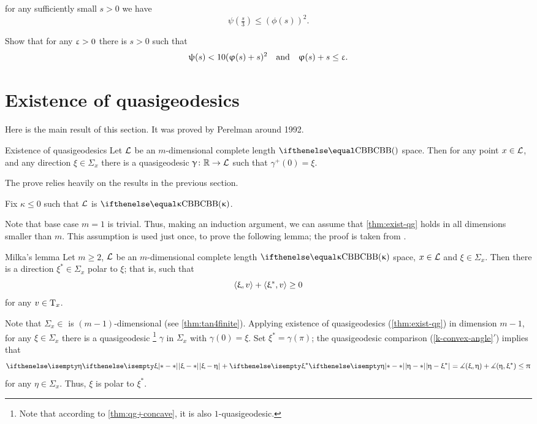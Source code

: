 \begin{subthm}{}for any sufficiently small $s>0$ we have
\[\psi(\tfrac{s}{3})\le (\phi(s))^2.\]
\end{subthm}
Show that for any $\upvarepsilon>0$ there is  $s>0$ such that
\[\psi(s)< 10 (\phi(s)+s)^2\ \ \ \text{and}\ \ \ \phi(s)+s\le\eps.\]

\endclaim\rm






\section{Existence of quasigeodesics}\label{step3-1}

Here is the main result of this section.
It was proved by Perelman around 1992.


\begin{thm}{Existence of quasigeodesics}\label{thm:exist-qg}
Let $\mathcal{L}$ be an $m$-dimensional complete length $\Alex{}$ space. 
Then for any point $x\in \spc{L}$, and any direction $\xi\in \Sigma_x$
there is a quasigeodesic $\gamma\:\RR\to \spc{L}$ such that 
$\gamma^+(0)=\xi$.
\end{thm}

The prove relies heavily on the results in the previous section.

Fix $\kappa\le0$ such that $\mathcal{L}$ is $\Alex\kappa$.

Note that base case $m=1$ is trivial.
Thus, making an induction argument, we can assume that \ref{thm:exist-qg} holds in all dimensions smaller than $m$.
This assumption is used just once, to prove the following lemma;
the proof is taken from \cite{milka:poly1}.

\begin{thm}{Milka's lemma}\label{lem-milka}
\label{lem:milka}
Let $m\ge 2$, 
$\mathcal{L}$ be an $m$-dimensional complete length $\Alex\kappa$ space, 
$x\in \spc{L}$ 
and $\xi\in \Sigma_x$.
Then there is a direction $\xi^*\in\Sigma_x$ polar to $\xi$; 
that is, such that
\[\<\xi,v\>+\<\xi^*,v\>\ge 0\]
for any $v\in \T_x$.
\end{thm}


 Note that $\Sigma_x\in$ is $(m-1)$-dimensional (see \ref{thm:tan4finite}). 
Applying  existence  of quasigeodesics (\ref{thm:exist-qg}) in dimension $m-1$,
for any 
$\xi\in \Sigma_x$ there is a quasigeodesic%
\footnote{Note that according to \ref{thm:qg+concave}, it is also $1$-quasigeodesic.}
 $\gamma$ in $\Sigma_x$ with $\gamma(0)=\xi$.
Set $\xi^*=\gamma(\pi)$;
the quasigeodesic comparison (\ref{k-convex-angle}$'$) implies that
\[\dist{\xi}{\eta}{}+\dist{\eta}{\xi^*}{}
=
\mangle(\xi,\eta)+\mangle(\eta,\xi^*)\leq\pi\] 
for any $\eta\in \Sigma_x$.
Thus, $\xi$ is polar to $\xi^*$.
\qeds




